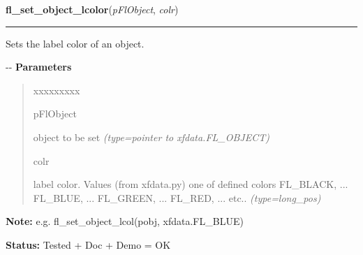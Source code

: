 \hspace{.8\funcindent}\begin{boxedminipage}{\funcwidth}

    \raggedright \textbf{fl\_set\_object\_lcolor}(\textit{pFlObject}, \textit{colr})

    \vspace{-1.5ex}

    \rule{\textwidth}{0.5\fboxrule}
\setlength{\parskip}{2ex}

Sets the label color of an object.

-{}-
\setlength{\parskip}{1ex}
      \textbf{Parameters}
      \vspace{-1ex}

      \begin{quote}
        \begin{Ventry}{xxxxxxxxx}

          \item[pFlObject]


object to be set
            {\it (type=pointer to xfdata.FL\_OBJECT)}

          \item[colr]


label color. Values (from xfdata.py) one of defined colors
FL\_BLACK, ... FL\_BLUE, ... FL\_GREEN, ... FL\_RED, ... etc..
            {\it (type=long\_pos)}

        \end{Ventry}

      \end{quote}

\textbf{Note:} 
e.g. fl\_set\_object\_lcol(pobj, xfdata.FL\_BLUE)


\textbf{Status:} 
Tested + Doc + Demo = OK


    \end{boxedminipage}

    \label{xformslib:flbasic:fl_get_object_lcol}

    \vspace{0.5ex}

